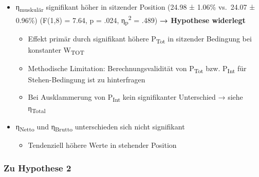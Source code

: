 \documentclass[
  letterpaper,
  DIV=11]{scrartcl}
\providecommand{\tightlist}{%
  \setlength{\itemsep}{0pt}\setlength{\parskip}{0pt}}\usepackage{longtable,booktabs,array}
\begin{document}
\begin{itemize}
\tightlist
\item
  η\textsubscript{muskulär} signifikant höher in sitzender Position
  (24.98 ± 1.06\% vs.~24.07 ± 0.96\%) (F(1,8) = 7.64, p = .024,
  η\textsubscript{p}\textsuperscript{2} = .489) \textbf{→ Hypothese
  widerlegt}

  \begin{itemize}
  \tightlist
  \item
    Effekt primär durch signifikant höhere P\textsubscript{Tot} in
    sitzender Bedingung bei konstanter W\textsubscript{TOT}
  \item
    Methodische Limitation: Berechnungsvalidität von
    P\textsubscript{Tot} bzw. P\textsubscript{Int} für Stehen-Bedingung
    ist zu hinterfragen
  \item
    Bei Ausklammerung von P\textsubscript{Int} kein signifikanter
    Unterschied → siehe η\textsubscript{Total}
  \end{itemize}
\item
  η\textsubscript{Netto} und η\textsubscript{Brutto} unterschieden sich
  nicht signifikant

  \begin{itemize}
  \tightlist
  \item
    Tendenziell höhere Werte in stehender Position
  \end{itemize}
\end{itemize}

\subsubsection{Zu Hypothese 2}\label{zu-hypothese-2}
\end{document}
